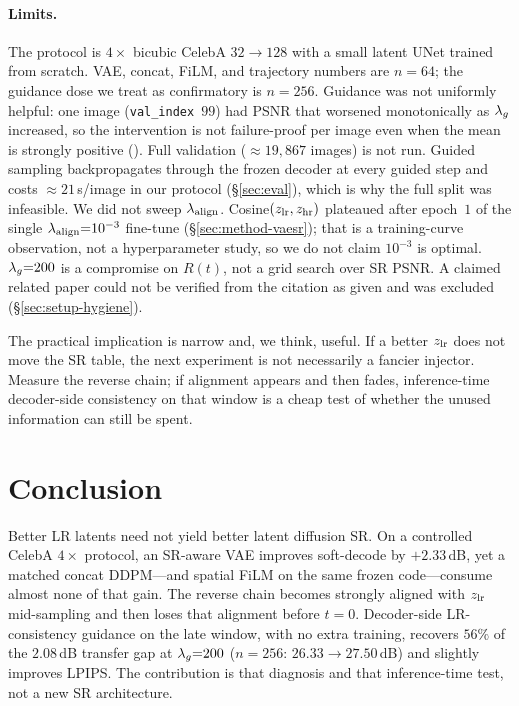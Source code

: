 \paragraph{Limits.}
The protocol is $4\times$ bicubic CelebA $32\to 128$ with a small
latent UNet trained from scratch.
VAE, concat, FiLM, and trajectory numbers are $n{=}64$; the
guidance dose we treat as confirmatory is $n{=}256$.
Guidance was not uniformly helpful: one image
(\texttt{val\_index}~$99$) had PSNR that worsened monotonically as
$\lambda_{g}$ increased, so the intervention is not failure-proof per
image even when the mean is strongly positive ().
Full validation ($\approx 19{,}867$ images) is not run.
Guided sampling backpropagates through the frozen decoder at every
guided step and costs $\approx 21$\,s/image in our protocol
(\S\ref{sec:eval}), which is why the full split was infeasible.
We did not sweep $\lambda_{\mathrm{align}}$.
Cosine$(z_{\mathrm{lr}},z_{\mathrm{hr}})$ plateaued after epoch~$1$ of the single
$\lambda_{\mathrm{align}}{=}10^{-3}$ fine-tune (\S\ref{sec:method-vaesr}); that is a
training-curve observation, not a hyperparameter study, so we do not
claim $10^{-3}$ is optimal.
$\lambda_{g}{=}200$ is a compromise on $R(t)$, not a grid search over SR
PSNR.
A claimed related paper could not be verified from the citation as
given and was excluded (\S\ref{sec:setup-hygiene}).

The practical implication is narrow and, we think, useful.
If a better $z_{\mathrm{lr}}$ does not move the SR table, the next experiment
is not necessarily a fancier injector.
Measure the reverse chain; if alignment appears and then fades,
inference-time decoder-side consistency on that window is a cheap
test of whether the unused information can still be spent.

\section{Conclusion}
\label{sec:conclusion}

Better LR latents need not yield better latent diffusion SR.
On a controlled CelebA $4\times$ protocol, an SR-aware VAE improves
soft-decode by $+2.33$\,dB, yet a matched concat DDPM---and spatial
FiLM on the same frozen code---consume almost none of that gain.
The reverse chain becomes strongly aligned with $z_{\mathrm{lr}}$ mid-sampling
and then loses that alignment before $t{=}0$.
Decoder-side LR-consistency guidance on the late window, with no
extra training, recovers $56\%$ of the $2.08$\,dB transfer gap at
$\lambda_{g}{=}200$ ($n{=}256$: $26.33\to 27.50$\,dB) and slightly
improves LPIPS.
The contribution is that diagnosis and that inference-time test,
not a new SR architecture.
